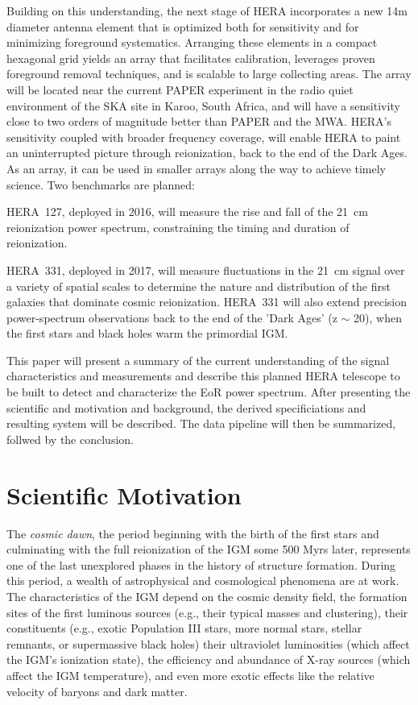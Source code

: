 \documentclass[ars]{/Users/daviddeboer1/Documents/Papers/Copernicus_LaTeX_Package_v_2_7/copernicus}
\begin{document}
Building on this understanding, the next stage of HERA incorporates a new
14m diameter antenna element that is optimized both for sensitivity
and for minimizing foreground systematics.  Arranging these elements
in a compact hexagonal grid yields an array that facilitates
calibration, leverages proven foreground removal techniques, and is
scalable to large collecting areas. The array will be located near the current PAPER
experiment
in the radio quiet environment of the SKA site in Karoo, South Africa,
and will have a sensitivity close to two orders of magnitude better than
PAPER and the MWA.  HERA's sensitivity coupled with broader frequency coverage, 
will enable HERA to paint an
uninterrupted picture through reionization, back to the end of the
Dark Ages.  As an array, it can be used in smaller arrays along the way to 
achieve timely science.  Two benchmarks are planned:

HERA~127, deployed in 2016, will measure the rise and fall of the
21~cm reionization power spectrum, constraining the timing and
duration of reionization.

HERA~331, deployed in 2017, will measure fluctuations in the 21~cm
signal over a variety of spatial scales to determine the nature and
distribution of the first galaxies that dominate cosmic
reionization. HERA~331 will also extend precision power-spectrum
observations back to the end of the 'Dark Ages' (z $\sim$ 20), when
the first stars and black holes warm the primordial IGM.

This paper will present a summary of the current understanding
of the signal characteristics and measurements and describe this planned
HERA telescope to be built to detect and characterize the EoR power
spectrum.  After presenting the scientific and motivation and background, the
derived specificiations and resulting system will be described.  The data pipeline
will then be summarized, follwed by the conclusion.

\section{Scientific Motivation}
\label{sec:science}

The {\it cosmic dawn}, the period beginning with the birth of the first stars and
culminating with the full reionization of the IGM some 500 Myrs later, represents one
of the last unexplored phases in the history of structure formation. During this
period, a wealth of astrophysical and cosmological phenomena are at work. The
characteristics of the IGM depend on the cosmic density field, the formation sites of
the first luminous sources (e.g., their typical masses and clustering), their
constituents (e.g., exotic Population III stars, more normal stars, stellar remnants,
or supermassive black holes) their ultraviolet luminosities (which affect the IGM's
ionization state), the efficiency and abundance of X-ray sources (which affect the
IGM temperature), and even more exotic effects like the relative velocity of baryons
and dark matter.
\end{document}
